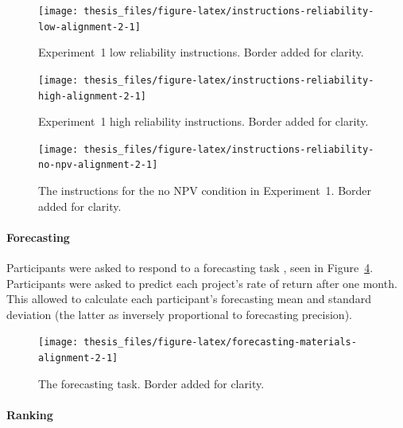 \documentclass[a4paper, nobind, dvipsnames]{templates/ociamthesis}
\theoremstyle{definition}
\theoremstyle{definition}
\theoremstyle{definition}
\theoremstyle{definition}
\theoremstyle{remark}
\begin{document}
\begin{figure}
\texttt{[image: thesis\_files/figure-latex/instructions-reliability-low-alignment-2-1]} \caption{Experiment~1 low reliability instructions. Border added for clarity.}\label{fig:instructions-reliability-low-alignment-2}
\end{figure}



\begin{figure}
\texttt{[image: thesis\_files/figure-latex/instructions-reliability-high-alignment-2-1]} \caption{Experiment~1 high reliability instructions. Border added for clarity.}\label{fig:instructions-reliability-high-alignment-2}
\end{figure}



\begin{figure}
\texttt{[image: thesis\_files/figure-latex/instructions-reliability-no-npv-alignment-2-1]} \caption{The instructions for the no NPV condition in Experiment~1. Border added for clarity.}\label{fig:instructions-reliability-no-npv-alignment-2}
\end{figure}

\hypertarget{forecasting-materials-alignment-2}{%
\paragraph{Forecasting}\label{forecasting-materials-alignment-2}}

Participants were asked to respond to a forecasting task \autocite[adapted from][]{long2018}, seen in Figure~\ref{fig:forecasting-materials-alignment-2}.
Participants were asked to predict each project's rate of return after one
month. This allowed to calculate each participant's forecasting mean and
standard deviation (the latter as inversely proportional to forecasting
precision).



\begin{figure}
\texttt{[image: thesis\_files/figure-latex/forecasting-materials-alignment-2-1]} \caption{The forecasting task. Border added for clarity.}\label{fig:forecasting-materials-alignment-2}
\end{figure}

\hypertarget{ranking-materials-alignment-2}{%
\paragraph{Ranking}\label{ranking-materials-alignment-2}}
\end{document}
